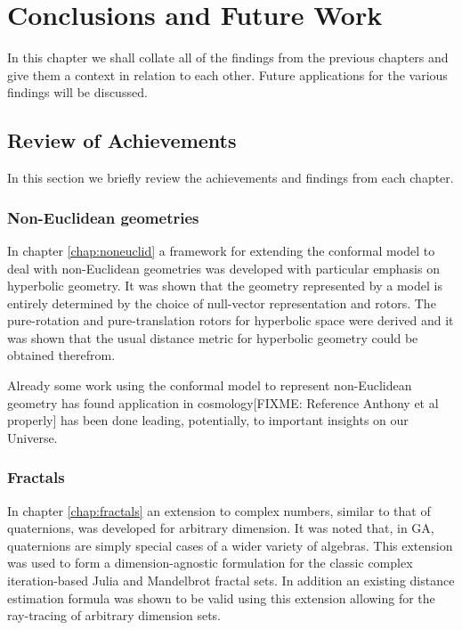 \chapter{Conclusions and Future Work}

In this chapter we shall collate all of the findings from the previous chapters
and give them a context in relation to each other. Future applications for
the various findings will be discussed.

\section{Review of Achievements}

In this section we briefly review the achievements and findings from each
chapter.

\subsection{Non-Euclidean geometries}

In chapter \ref{chap:noneuclid} a framework for extending the conformal
model to deal with non-Euclidean geometries was developed with particular
emphasis on hyperbolic geometry. It was shown that the geometry
represented by a model is entirely determined by the choice of null-vector
representation and rotors. The pure-rotation and pure-translation 
rotors for hyperbolic space were derived and it was shown that the usual
distance metric for hyperbolic geometry could be obtained therefrom.

Already some work using the conformal model to represent non-Euclidean geometry
has found application in cosmology\cite{GA:SIGKEY}[FIXME: Reference Anthony 
et al properly] has been done leading, potentially, to important insights on
our Universe.

\subsection{Fractals}

In chapter \ref{chap:fractals} an extension to complex numbers, similar to that
of quaternions, was developed for arbitrary dimension. It was noted that, in
GA, quaternions are simply special cases of a wider variety of algebras. This
extension was used to form a dimension-agnostic formulation for the classic
complex iteration-based Julia and Mandelbrot fractal sets. In addition an
existing distance estimation formula was shown to be valid using this extension
allowing for the ray-tracing of arbitrary dimension sets.

